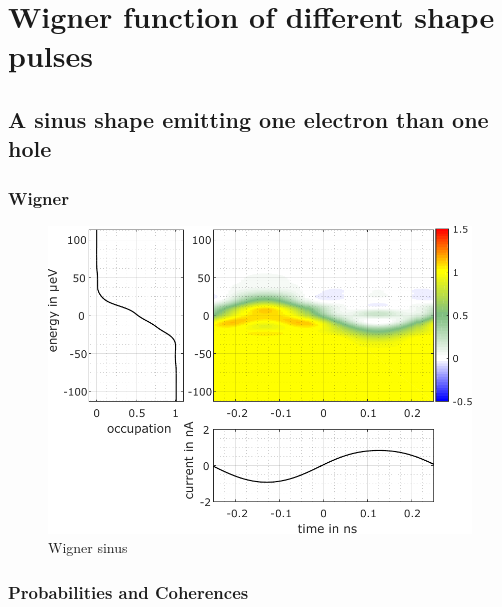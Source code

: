 \chapter{Wigner function of different shape pulses}


\section{A sinus shape emitting one electron than one hole}

\subsection{Wigner}

\begin{figure}[hptb]
	\begin{center}
		\includegraphics[width = 10 cm]{./appC/wigData_sinus_Projected_Gradient_Method} 
	\end{center}
	
	\caption{Wigner sinus}
	\label{fig: Wigner sinus}
\end{figure}

\subsection{Probabilities and Coherences}


